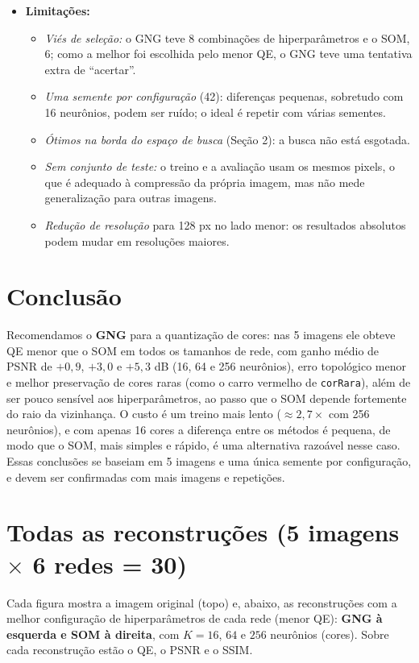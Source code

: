 \documentclass[11pt,a4paper]{article}
\begin{document}
\begin{itemize}
    \item \textbf{Limitações:}
    \begin{itemize}
        \item \textit{Viés de seleção:} o GNG teve 8 combinações de hiperparâmetros e o SOM, 6; como a melhor foi escolhida pelo menor QE, o GNG teve uma tentativa extra de ``acertar''.
        \item \textit{Uma semente por configuração} (42): diferenças pequenas, sobretudo com 16 neurônios, podem ser ruído; o ideal é repetir com várias sementes.
        \item \textit{Ótimos na borda do espaço de busca} (Seção 2): a busca não está esgotada.
        \item \textit{Sem conjunto de teste:} o treino e a avaliação usam os mesmos pixels, o que é adequado à compressão da própria imagem, mas não mede generalização para outras imagens.
        \item \textit{Redução de resolução} para 128 px no lado menor: os resultados absolutos podem mudar em resoluções maiores.
    \end{itemize}
\end{itemize}

\section{Conclusão}

Recomendamos o \textbf{GNG} para a quantização de cores: nas 5 imagens ele obteve QE menor que o SOM em todos os tamanhos de rede, com ganho médio de PSNR de $+0{,}9$, $+3{,}0$ e $+5{,}3$ dB (16, 64 e 256 neurônios), erro topológico menor e melhor preservação de cores raras (como o carro vermelho de \texttt{corRara}), além de ser pouco sensível aos hiperparâmetros, ao passo que o SOM depende fortemente do raio da vizinhança. O custo é um treino mais lento ($\approx 2{,}7\times$ com 256 neurônios), e com apenas 16 cores a diferença entre os métodos é pequena, de modo que o SOM, mais simples e rápido, é uma alternativa razoável nesse caso. Essas conclusões se baseiam em 5 imagens e uma única semente por configuração, e devem ser confirmadas com mais imagens e repetições.

\appendix
\section{Todas as reconstruções (5 imagens $\times$ 6 redes = 30)}
\label{ap:todas}

Cada figura mostra a imagem original (topo) e, abaixo, as reconstruções com a melhor configuração de hiperparâmetros de cada rede (menor QE): \textbf{GNG à esquerda e SOM à direita}, com $K=16$, $64$ e $256$ neurônios (cores). Sobre cada reconstrução estão o QE, o PSNR e o SSIM.
\end{document}
